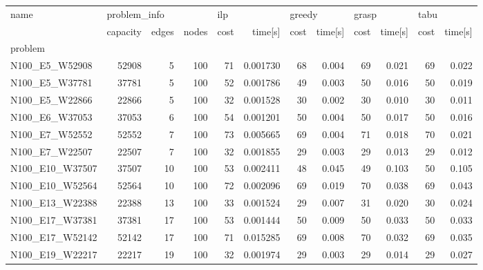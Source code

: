 \begin{landscape}

\begin{table}
\centering
\begin{tabular}{lrrrrrrrrrrr}
\toprule
name & \multicolumn{3}{l}{problem\_info} & \multicolumn{2}{l}{ilp} & \multicolumn{2}{l}{greedy} & \multicolumn{2}{l}{grasp} & \multicolumn{2}{l}{tabu} \\
{} &     capacity & edges & nodes & cost &   time[s] &   cost & time[s] &  cost & time[s] & cost & time[s] \\
problem         &              &       &       &      &           &        &         &       &         &      &         \\
\midrule
N100\_E5\_W52908  &        52908 &     5 &   100 &   71 &  0.001730 &     68 &   0.004 &    69 &   0.021 &   69 &   0.022 \\
N100\_E5\_W37781  &        37781 &     5 &   100 &   52 &  0.001786 &     49 &   0.003 &    50 &   0.016 &   50 &   0.019 \\
N100\_E5\_W22866  &        22866 &     5 &   100 &   32 &  0.001528 &     30 &   0.002 &    30 &   0.010 &   30 &   0.011 \\
N100\_E6\_W37053  &        37053 &     6 &   100 &   54 &  0.001201 &     50 &   0.004 &    50 &   0.017 &   50 &   0.016 \\
N100\_E7\_W52552  &        52552 &     7 &   100 &   73 &  0.005665 &     69 &   0.004 &    71 &   0.018 &   70 &   0.021 \\
N100\_E7\_W22507  &        22507 &     7 &   100 &   32 &  0.001855 &     29 &   0.003 &    29 &   0.013 &   29 &   0.012 \\
N100\_E10\_W37507 &        37507 &    10 &   100 &   53 &  0.002411 &     48 &   0.045 &    49 &   0.103 &   50 &   0.105 \\
N100\_E10\_W52564 &        52564 &    10 &   100 &   72 &  0.002096 &     69 &   0.019 &    70 &   0.038 &   69 &   0.043 \\
N100\_E13\_W22388 &        22388 &    13 &   100 &   33 &  0.001524 &     29 &   0.007 &    31 &   0.020 &   30 &   0.024 \\
N100\_E17\_W37381 &        37381 &    17 &   100 &   53 &  0.001444 &     50 &   0.009 &    50 &   0.033 &   50 &   0.033 \\
N100\_E17\_W52142 &        52142 &    17 &   100 &   71 &  0.015285 &     69 &   0.008 &    70 &   0.032 &   69 &   0.035 \\
N100\_E19\_W22217 &        22217 &    19 &   100 &   32 &  0.001974 &     29 &   0.003 &    29 &   0.014 &   29 &   0.027 \\

\end{tabular}
\end{table}
\end{landscape}
